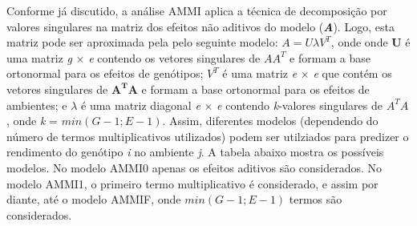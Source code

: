 \documentclass[
]{book}
\numberwithin{equation}{section}
\newcommand{\indt}[1]{\index{#1|ST}}
\begin{document}
Conforme já discutido, a análise AMMI \indt{AMMI}aplica a técnica de decomposição por valores singulares na matriz dos efeitos não aditivos do modelo (\textbf{\emph{A}}). Logo, esta matriz pode ser aproximada pela pelo seguinte modelo: \(A = U \lambda V^T\), onde onde \textbf{U} é uma matriz \emph{g} \(\times\) \emph{e} contendo os vetores singulares de \(AA^T\) e formam a base ortonormal para os efeitos de genótipos; \(V^T\) é uma matriz \emph{e} \(\times\) \emph{e} que contém os vetores singulares de \(\mathbf{A^TA}\) e formam a base ortonormal para os efeitos de ambientes; e \(\lambda\) é uma matriz diagonal \emph{e} \(\times\) \emph{e} contendo \emph{k}-valores singulares de \(A^TA\) , onde \emph{k} = \(min(G-1; E-1)\). Assim, diferentes modelos (dependendo do número de termos multiplicativos utilizados) podem ser utilziados para predizer o rendimento do genótipo \emph{i} no ambiente \emph{j}. A tabela abaixo mostra os possíveis modelos. No modelo AMMI0 apenas os efeitos aditivos são considerados. No modelo AMMI1, o primeiro termo multiplicativo é considerado, e assim por diante, até o modelo AMMIF, onde \(min(G-1;E-1)\) termos são considerados.
\end{document}
